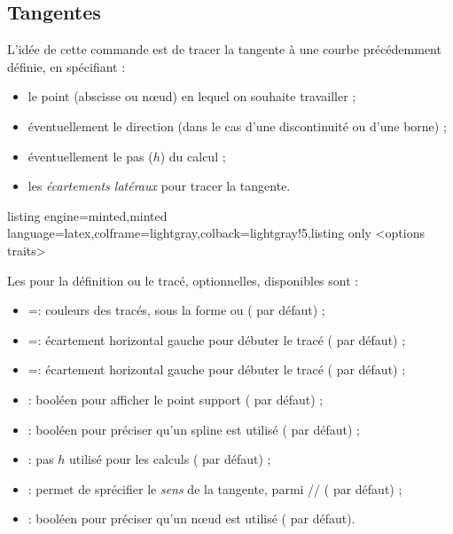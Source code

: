 \documentclass[11pt,a4paper]{ltxdoc}
\begin{document}
\pagebreak

\subsection{Tangentes}\label{tgte}

L'idée de cette commande est de tracer la tangente à une courbe précédemment définie, en spécifiant :

\begin{itemize}
  \item le point (abscisse ou nœud) en lequel on souhaite travailler ;
  \item éventuellement le direction (dans le cas d'une discontinuité ou d'une borne) ;
  \item éventuellement le pas ($h$) du calcul ;
  \item les \textit{écartements latéraux} pour tracer la tangente.
\end{itemize}

\begin{tcblisting}{listing engine=minted,minted language=latex,colframe=lightgray,colback=lightgray!5,listing only}
<options traits>
\end{tcblisting}

Les \MontreCode{[clés]} pour la définition ou le tracé, optionnelles, disponibles sont :

\begin{itemize}
  \item {} =: couleurs des tracés, sous la forme  ou  ( par défaut) ;
  \item {} =: écartement horizontal gauche pour débuter le tracé ( par défaut) ;
  \item {} =: écartement horizontal gauche pour débuter le tracé ( par défaut) ;
  \item {} : booléen pour afficher le point support ( par défaut) ;
  \item {} : booléen pour préciser qu'un spline est utilisé ( par défaut) ;
  \item {} : pas $h$ utilisé pour les calculs ( par défaut) ;
  \item {} : permet de sprécifier le \textit{sens} de la tangente, parmi // ( par défaut) ;
  \item {} : booléen pour préciser qu'un nœud est utilisé ( par défaut).
\end{itemize}
\end{document}
